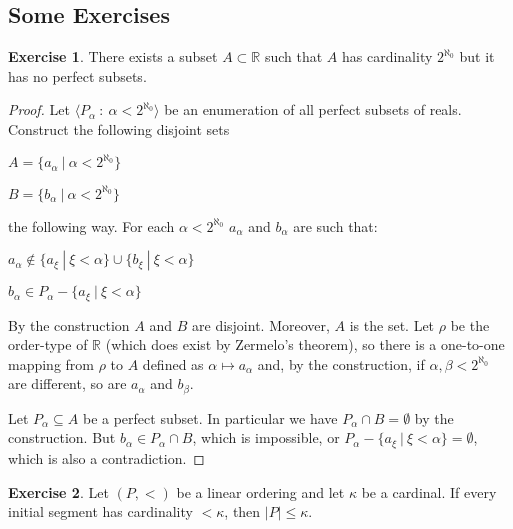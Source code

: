 \documentclass[8pt]{article}
\theoremstyle{definition}
\theoremstyle{definition}
\theoremstyle{definition}
\theoremstyle{definition}
\theoremstyle{definition}
\theoremstyle{definition}
\theoremstyle{definition}
\theoremstyle{definition}
\theoremstyle{definition}
\theoremstyle{definition}
\theoremstyle{definition}
\theoremstyle{definition}
\theoremstyle{definition}
\newtheorem{exercise}{Exercise}[section]
\theoremstyle{definition}
\theoremstyle{question}
\begin{document}
\subsection{Some Exercises}

\begin{exercise}
  There exists a subset $A \subset \mathbb{R}$ such that $A$ has cardinality $2^{\aleph_0}$ but it has no
  perfect subsets. 
\end{exercise}

\begin{proof}
  Let $\langle P_{\alpha} \: : \: \alpha < 2^{\aleph_0} \rangle$ be an enumeration of all perfect
  subsets of reals. Construct the following disjoint sets

  \begin{center}
    $A = \{ a_{\alpha} \: | \: \alpha < 2^{\aleph_0} \}$

    $B = \{ b_{\alpha} \: | \: \alpha < 2^{\aleph_0} \}$
  \end{center}
  the following way. For each $\alpha < 2^{\aleph_0}$ $a_{\alpha}$ and $b_{\alpha}$ are such that:
  \begin{center}
    $a_{\alpha} \notin \{ a_{\xi} \: | \: \xi < \alpha \} \cup \{ b_{\xi} \: | \: \xi < \alpha \}$

    $b_{\alpha} \in P_{\alpha} - \{ a_{\xi} \: | \: \xi < \alpha \}$
  \end{center}

  By the construction $A$ and $B$ are disjoint. Moreover, $A$ is the set. 
  Let $\rho$ be the order-type of $\mathbb{R}$ (which does exist by Zermelo's theorem), so there is a one-to-one
  mapping from $\rho$ to $A$ defined as $\alpha \mapsto a_{\alpha}$ and, by the construction, if 
  $\alpha, \beta < 2^{\aleph_0}$ are different, so are $a_{\alpha}$ and $b_{\beta}$.

  Let $P_{\alpha} \subseteq A$ be a perfect subset. In particular we have $P_{\alpha} \cap B= \emptyset$ by the construction.
  But $b_{\alpha} \in P_{\alpha} \cap B$, which is impossible, or $P_{\alpha} - \{ a_{\xi} \: | \: \xi < \alpha \} = \emptyset$, 
  which is also a contradiction.
\end{proof}

\begin{exercise}
  Let $(P, <)$ be a linear ordering and let $\kappa$ be a cardinal. 
  If every initial segment has cardinality $< \kappa$, then $|P| \leq \kappa$.
\end{exercise}
\end{document}
